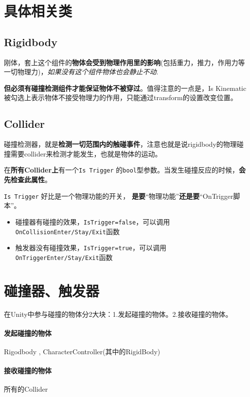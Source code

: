\documentclass[UTF8,a4paper,12pt]{ctexbook}
\begin{document}
	\section{具体相关类}
		\subsection{Rigidbody}
			刚体，套上这个组件的\textbf{物体会受到物理作用里的影响}(包括重力，推力，作用力等一切物理力)，\textit{如果没有这个组件物体也会静止不动}.
			
			\textbf{但必须有碰撞检测组件才能保证物体不被穿过}。值得注意的一点是，Is Kinematic被勾选上表示物体不接受物理力的作用，只能通过transform的设置改变位置。
		
		\subsection{Collider}
			碰撞检测器，就是\textbf{检测一切范围内的触碰事件}，注意也就是说rigidbody的物理碰撞需要collider来检测才能发生，也就是物体的运动。
		
			在\textbf{所有Collider上}有一个\verb|Is Trigger| 的\verb|bool|型参数。当发生碰撞反应的时候，\textbf{会先检查此属性}。
				
			\verb|Is Trigger| 好比是一个物理功能的开关， \textbf{是要}“物理功能”\textbf{还是要}“OnTrigger脚本”。
			\begin{itemize}
				\item 碰撞器有碰撞的效果，\verb|IsTrigger=false|，可以调用\verb|OnCollisionEnter/Stay/Exit|函数
				\item 触发器没有碰撞效果，\verb|IsTrigger=true|，可以调用\verb|OnTriggerEnter/Stay/Exit|函数
			\end{itemize}
	
	\section{碰撞器、触发器}
		在Unity中参与碰撞的物体分2大块：1.发起碰撞的物体。2.接收碰撞的物体。
		
		\paragraph{发起碰撞的物体}
			Rigodbody , CharacterController(其中的RigidBody) 
		
		\paragraph{接收碰撞的物体}
			所有的Collider
			
\end{document}

